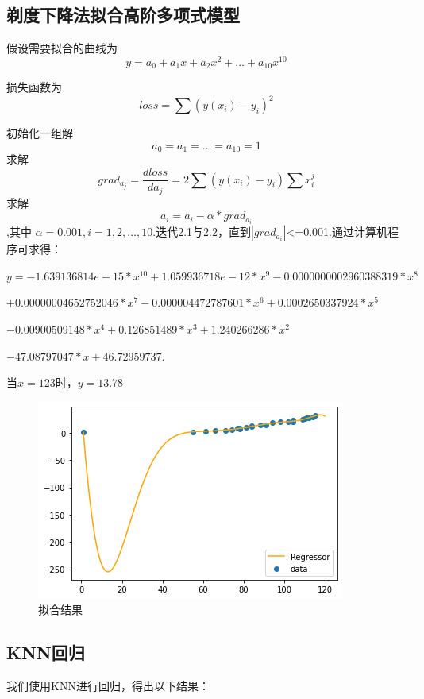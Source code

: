 \subsection{剃度下降法拟合高阶多项式模型}
假设需要拟合的曲线为$$y=a_0+a_1x+a_2x^2+\dots+a_{10}x^{10}$$

损失函数为$$loss=\sum(y(x_i)-y_i)^2$$


初始化一组解$$a_0=a_1=\dots=a_{10}=1$$
求解
\begin{equation}
grad_{a_j}=\frac{dloss}{da_j}=2 \sum(y(x_i)-y_i) \sum x_i^j
\end{equation}
求解
\begin{equation}
a_i=a_i - \alpha *grad_{a_i}
\end{equation}
,其中 $\alpha = 0.001,i=1,2,\dots,10.$迭代2.1与2.2，直到$|grad_{a_i}|$<=0.001.通过计算机程序可求得：

$y=- 1.639136814e-15*x^{10} + 1.059936718e-12*x^9 - 0.0000000002960388319*x^8 $

$+ 0.00000004652752046*x^7 - 0.000004472787601*x^6 + 0.0002650337924*x^5$ 

$- 0.00900509148*x^4 + 0.126851489*x^3 + 1.240266286*x^2 $

$- 47.08797047*x + 46.72959737.$


当$x=123$时，$y=13.78$

\begin{figure}[h]
	\centering
	\includegraphics[scale=0.55,angle=0]{images/10.png}
	\caption{拟合结果}
	\label{10}
\end{figure}


\subsection{KNN回归}
我们使用KNN进行回归，得出以下结果：


